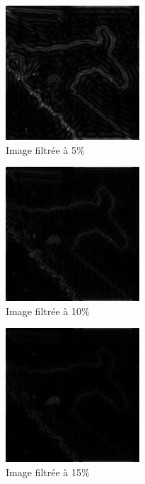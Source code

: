 \documentclass[a4paper]{article}
\begin{document}
\begin{figure}[!ht]
    \center
    \includegraphics[width=5cm]{../images/evert_filtre_05.png}
    \caption{Image filtrée à 5\%}
\end{figure}

\begin{figure}[!ht]
    \center
    \includegraphics[width=5cm]{../images/evert_filtre_10.png}
    \caption{Image filtrée à 10\%}
\end{figure}

\begin{figure}[!ht]
    \center
    \includegraphics[width=5cm]{../images/evert_filtre_15.png}
    \caption{Image filtrée à 15\%}
\end{figure}
\end{document}
